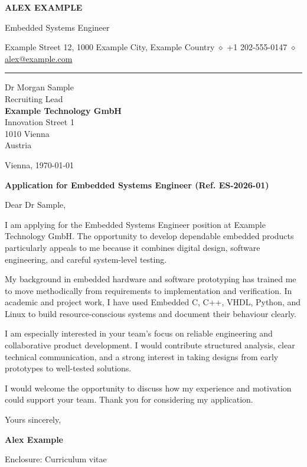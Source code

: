 \documentclass[11pt,a4paper]{article}
\makeatletter
\newcommand{\ApplicantName}{Alex Example}
\newcommand{\ApplicantHeadline}{Embedded Systems Engineer}
\newcommand{\ApplicantAddress}{Example Street 12, 1000 Example City, Example Country}
\newcommand{\ApplicantPhone}{+1 202-555-0147}
\newcommand{\ApplicantEmail}{alex@example.com}
\newcommand{\RecipientName}{Dr Morgan Sample}
\newcommand{\RecipientRole}{Recruiting Lead}
\newcommand{\RecipientOrganisation}{Example Technology GmbH}
\newcommand{\RecipientAddress}{Innovation Street 1\\1010 Vienna\\Austria}
\newcommand{\ApplicationPlace}{Vienna}
\newcommand{\ApplicationDate}{\today}
\newcommand{\ApplicationSubject}{Application for Embedded Systems Engineer (Ref. ES-2026-01)}
\newcommand{\ApplicationSalutation}{Dear Dr Sample,}
\makeatother
\begin{document}
{\centering
  {\LARGE\bfseries\MakeUppercase{\ApplicantName}\par}
  \vspace{0.05em}
  \ApplicantHeadline\par
  \vspace{0.12em}
  {\small
    \ApplicantAddress
    \enspace\textcolor{cvmuted}{$\diamond$}\enspace
    \ApplicantPhone
    \enspace\textcolor{cvmuted}{$\diamond$}\enspace
    \href{mailto:\ApplicantEmail}{\ApplicantEmail}\par
  }
}

\vspace{0.55em}
\hrule
\vspace{1.5em}

\begin{minipage}[t]{0.58\textwidth}
  \RecipientName\\
  \RecipientRole\\
  \textbf{\RecipientOrganisation}\\
  \RecipientAddress
\end{minipage}%
\hfill
\begin{minipage}[t]{0.36\textwidth}
  \raggedleft
  \ApplicationPlace, \ApplicationDate
\end{minipage}

\vspace{1.45em}
{\bfseries\ApplicationSubject\par}
\vspace{0.25em}

\ApplicationSalutation

I am applying for the Embedded Systems Engineer position at Example Technology
GmbH. The opportunity to develop dependable embedded products particularly
appeals to me because it combines digital design, software engineering, and
careful system-level testing.

My background in embedded hardware and software prototyping has trained me to
move methodically from requirements to implementation and verification. In
academic and project work, I have used Embedded C, C++, VHDL, Python, and Linux
to build resource-conscious systems and document their behaviour clearly.

I am especially interested in your team's focus on reliable engineering and
collaborative product development. I would contribute structured analysis,
clear technical communication, and a strong interest in taking designs from
early prototypes to well-tested solutions.

I would welcome the opportunity to discuss how my experience and motivation
could support your team. Thank you for considering my application.

Yours sincerely,

\vspace{0.7em}
\textbf{\ApplicantName}

\vfill
{\small\textcolor{cvmuted}{Enclosure: Curriculum vitae}}
\end{document}

